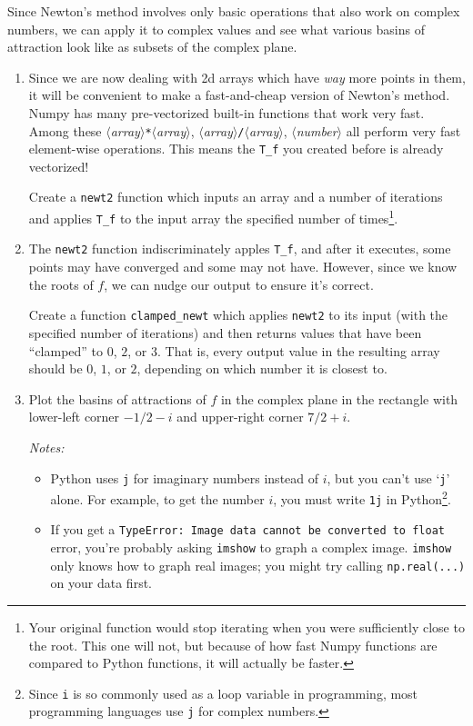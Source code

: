 \documentclass[letter]{article}
\newcommand{\var}[1]{{$\langle$\it #1$\rangle$}}
\begin{document}
\begin{enumerate}
			Since Newton's method involves only basic operations that also work on complex numbers,
			we can apply it to complex values and see what various basins of attraction look like as subsets of
			the complex plane.
			\begin{enumerate}
				\item Since we are now dealing with 2d arrays which have \emph{way} more points in them,
					it will be convenient to make a fast-and-cheap version of Newton's method. Numpy
					has many pre-vectorized built-in functions that work very fast. Among these
					\var{array}\verb|*|\var{array}, \var{array}\verb|/|\var{array}, \var{number}\pm\var{array}
					all perform very fast element-wise operations. This means the \verb|T_f| you created before
					is already vectorized!

					Create a \verb|newt2| function which inputs an array and a number of iterations
					and applies \verb|T_f| to the input array the specified number of times\footnote{ Your original
					function would stop iterating when you were sufficiently close to the root. This one will not,
					but because of how fast Numpy functions are compared to Python functions, it will actually
					be faster.}.
				\item The \verb|newt2| function indiscriminately apples \verb|T_f|, and after it executes, some points may
					have converged and some may not have. However, since we know the roots of $f$, we 
					can nudge our output
					to ensure it's correct.

					Create a function \verb|clamped_newt| which applies \verb|newt2| to its input 
					(with the specified number of iterations) and then returns values that have been ``clamped''
					to $0$, $2$, or $3$. That is, every output value in the resulting array should be $0$, $1$, or $2$,
					depending on which number it is closest to.

				\item Plot the basins of attractions of $f$ in the complex plane in the rectangle with lower-left corner
					$-1/2-i$ and upper-right corner $7/2+i$. 

					\emph{Notes:}
					\begin{itemize}
						\item Python uses {\tt j} for imaginary numbers
							instead of $i$, but you can't use `{\tt j}' alone. For example, to get the number $i$, you must
							write {\tt 1j} in Python\footnote{ Since {\tt i} is so commonly used
							as a loop variable in programming, most programming languages use {\tt j}
							for complex numbers.}.
						\item If you get a {\tt TypeError: Image data cannot be converted to float}
							error, you're probably asking {\tt imshow} to graph a complex image. {\tt imshow}
							only knows how to graph
					real images; you might try calling {\tt np.real(...)} on your data first.
					\end{itemize}


\end{enumerate}
\end{enumerate}
\end{document}
